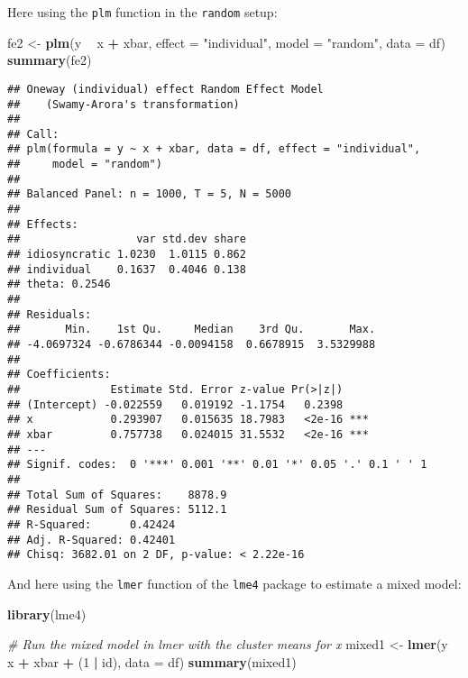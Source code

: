 \documentclass[]{interact}
\theoremstyle{plain}%
\theoremstyle{definition}
\theoremstyle{remark}
\newenvironment{Shaded}{\begin{snugshade}}{\end{snugshade}}
\newcommand{\CommentTok}[1]{\textcolor[rgb]{0.56,0.35,0.01}{\textit{#1}}}
\newcommand{\DataTypeTok}[1]{\textcolor[rgb]{0.13,0.29,0.53}{#1}}
\newcommand{\DecValTok}[1]{\textcolor[rgb]{0.00,0.00,0.81}{#1}}
\newcommand{\KeywordTok}[1]{\textcolor[rgb]{0.13,0.29,0.53}{\textbf{#1}}}
\newcommand{\NormalTok}[1]{#1}
\newcommand{\OperatorTok}[1]{\textcolor[rgb]{0.81,0.36,0.00}{\textbf{#1}}}
\newcommand{\StringTok}[1]{\textcolor[rgb]{0.31,0.60,0.02}{#1}}
\begin{document}
\doublespacing

Here using the \texttt{plm} function in the \texttt{random} setup:

\singlespacing

\begin{Shaded}
\begin{Highlighting}[]
\NormalTok{fe2 <-}\StringTok{ }\KeywordTok{plm}\NormalTok{(y }\OperatorTok{~}\StringTok{ }\NormalTok{x }\OperatorTok{+}\StringTok{ }\NormalTok{xbar, }
           \DataTypeTok{effect =} \StringTok{"individual"}\NormalTok{, }\DataTypeTok{model =} \StringTok{"random"}\NormalTok{,}
           \DataTypeTok{data =}\NormalTok{ df)}
\KeywordTok{summary}\NormalTok{(fe2)}
\end{Highlighting}
\end{Shaded}

\begin{verbatim}
## Oneway (individual) effect Random Effect Model 
##    (Swamy-Arora's transformation)
## 
## Call:
## plm(formula = y ~ x + xbar, data = df, effect = "individual", 
##     model = "random")
## 
## Balanced Panel: n = 1000, T = 5, N = 5000
## 
## Effects:
##                  var std.dev share
## idiosyncratic 1.0230  1.0115 0.862
## individual    0.1637  0.4046 0.138
## theta: 0.2546
## 
## Residuals:
##       Min.    1st Qu.     Median    3rd Qu.       Max. 
## -4.0697324 -0.6786344 -0.0094158  0.6678915  3.5329988 
## 
## Coefficients:
##              Estimate Std. Error z-value Pr(>|z|)    
## (Intercept) -0.022559   0.019192 -1.1754   0.2398    
## x            0.293907   0.015635 18.7983   <2e-16 ***
## xbar         0.757738   0.024015 31.5532   <2e-16 ***
## ---
## Signif. codes:  0 '***' 0.001 '**' 0.01 '*' 0.05 '.' 0.1 ' ' 1
## 
## Total Sum of Squares:    8878.9
## Residual Sum of Squares: 5112.1
## R-Squared:      0.42424
## Adj. R-Squared: 0.42401
## Chisq: 3682.01 on 2 DF, p-value: < 2.22e-16
\end{verbatim}

\doublespacing

And here using the \texttt{lmer} function of the \texttt{lme4} package
\citep{Bates2015} to estimate a mixed model:

\singlespacing

\begin{Shaded}
\begin{Highlighting}[]
\KeywordTok{library}\NormalTok{(lme4)}

\CommentTok{# Run the mixed model in lmer with the cluster means for x }
\NormalTok{mixed1 <-}\StringTok{ }\KeywordTok{lmer}\NormalTok{(y }\OperatorTok{~}\StringTok{ }\NormalTok{x }\OperatorTok{+}\StringTok{ }\NormalTok{xbar }\OperatorTok{+}\StringTok{ }\NormalTok{(}\DecValTok{1} \OperatorTok{|}\StringTok{ }\NormalTok{id), }\DataTypeTok{data =}\NormalTok{ df)}
\KeywordTok{summary}\NormalTok{(mixed1)}
\end{Highlighting}
\end{Shaded}
\end{document}
